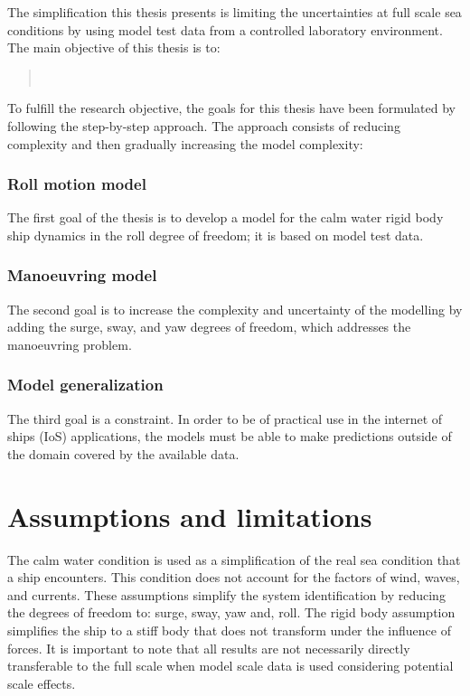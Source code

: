\noindent The simplification this thesis presents is limiting the uncertainties at full scale sea conditions by using model test data from a controlled laboratory environment. The main objective of this thesis is to:
\begin{quote}
\vspace{0.1cm}
\expandafter\MakeUppercase \objective \\
\vspace{-0.3cm}
\end{quote}
To fulfill the research objective, the goals for this thesis have been formulated by following the step-by-step approach. The approach consists of reducing complexity and then gradually increasing the model complexity:

\subsubsection*{\normalfont \color{black} \textbf{Roll motion model}}
The first goal of the thesis is to develop a model for the calm water rigid body ship dynamics in the roll degree of freedom; it is based on model test data.

\subsubsection*{\normalfont \color{black} \textbf{Manoeuvring model}}
The second goal is to increase the complexity and uncertainty of the modelling by adding the surge, sway, and yaw degrees of freedom, which addresses the manoeuvring problem.

\subsubsection*{\normalfont \color{black} \textbf{Model generalization}}
The third goal is a constraint. In order to be of practical use in the internet of ships (IoS) applications, the models must be able to make predictions outside of the domain covered by the available data.

\section{Assumptions and limitations}
The calm water condition is used as a simplification of the real sea condition that a ship encounters. This condition does not account for the factors of wind, waves, and currents. These assumptions simplify the system identification by reducing the degrees of freedom to: surge, sway, yaw and, roll. 
The rigid body assumption simplifies the ship to a stiff body that does not transform under the influence of forces. 
It is important to note that all results are not necessarily directly transferable to the full scale when model scale data is used considering potential scale effects. 

